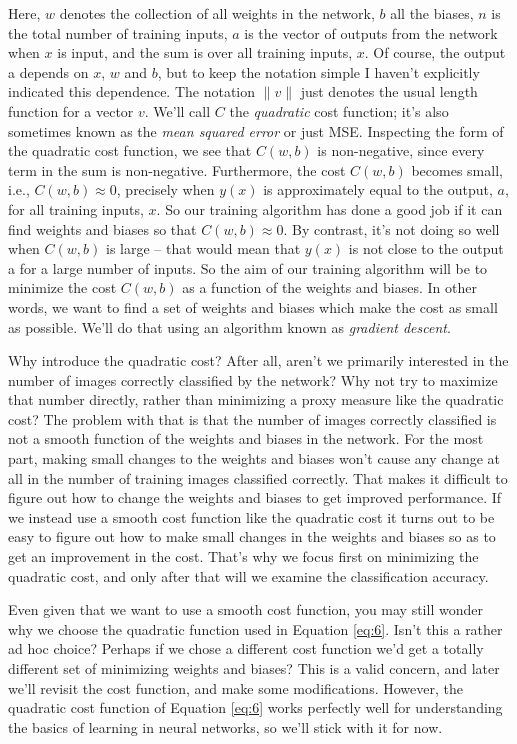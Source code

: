 \documentclass[a4paper,twoside,10pt]{book}
\begin{document}
Here, $w$ denotes the collection of all weights in the network, $b$ all the biases, $n$ is the total number of training inputs, $a$ is the vector of outputs from the network when $x$ is input, and the sum is over all training inputs, $x$. Of course, the output a depends on $x$, $w$ and $b$, but to keep the notation simple I haven't explicitly indicated this dependence. The notation $\|v\|$ just denotes the usual length function for a vector $v$. We'll call $C$ the \textit{quadratic} cost function; it's also sometimes known as the \textit{mean squared error} or just MSE. Inspecting the form of the quadratic cost function, we see that $C(w,b)$ is non-negative, since every term in the sum is non-negative. Furthermore, the cost $C(w,b)$ becomes small, i.e., $C(w,b)\approx0$, precisely when $y(x)$ is approximately equal to the output, $a$, for all training inputs, $x$. So our training algorithm has done a good job if it can find weights and biases so that $C(w,b)\approx0$. By contrast, it's not doing so well when $C(w,b)$ is large -- that would mean that $y(x)$ is not close to the output a for a large number of inputs. So the aim of our training algorithm will be to minimize the cost $C(w,b)$ as a function of the weights and biases. In other words, we want to find a set of weights and biases which make the cost as small as possible. We'll do that using an algorithm known as \textit{gradient descent}.

Why introduce the quadratic cost? After all, aren't we primarily interested in the number of images correctly classified by the network? Why not try to maximize that number directly, rather than minimizing a proxy measure like the quadratic cost? The problem with that is that the number of images correctly classified is not a smooth function of the weights and biases in the network. For the most part, making small changes to the weights and biases won't cause any change at all in the number of training images classified correctly. That makes it difficult to figure out how to change the weights and biases to get improved performance. If we instead use a smooth cost function like the quadratic cost it turns out to be easy to figure out how to make small changes in the weights and biases so as to get an improvement in the cost. That's why we focus first on minimizing the quadratic cost, and only after that will we examine the classification accuracy.

Even given that we want to use a smooth cost function, you may still wonder why we choose the quadratic function used in Equation \ref{eq:6}. Isn't this a rather ad hoc choice? Perhaps if we chose a different cost function we'd get a totally different set of minimizing weights and biases? This is a valid concern, and later we'll revisit the cost function, and make some modifications. However, the quadratic cost function of Equation \ref{eq:6} works perfectly well for understanding the basics of learning in neural networks, so we'll stick with it for now.
\end{document}
